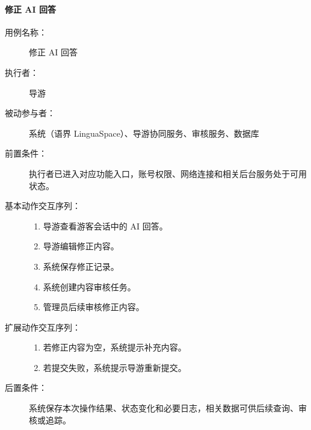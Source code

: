 \paragraph{修正 AI 回答}
\begin{description}
  \item[用例名称：] 修正 AI 回答
  \item[执行者：] 导游
  \item[被动参与者：] 系统（语界 LinguaSpace）、导游协同服务、审核服务、数据库
  \item[前置条件：] 执行者已进入对应功能入口，账号权限、网络连接和相关后台服务处于可用状态。
  \item[基本动作交互序列：]
  \begin{enumerate}
    \item 导游查看游客会话中的 AI 回答。
    \item 导游编辑修正内容。
    \item 系统保存修正记录。
    \item 系统创建内容审核任务。
    \item 管理员后续审核修正内容。
  \end{enumerate}
  \item[扩展动作交互序列：]
  \begin{enumerate}
    \item[2a.] 若修正内容为空，系统提示补充内容。
    \item[4a.] 若提交失败，系统提示导游重新提交。
  \end{enumerate}
  \item[后置条件：] 系统保存本次操作结果、状态变化和必要日志，相关数据可供后续查询、审核或追踪。
\end{description}

